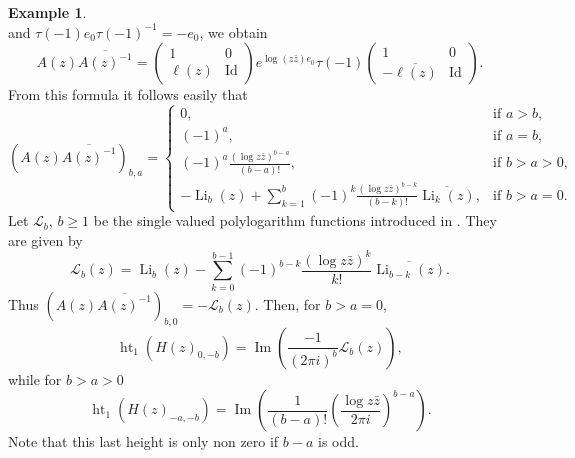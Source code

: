 \documentclass[11pt,a4paper]{amsart}
\newcommand{\caL}{\mathcal{L}}
\DeclareMathOperator{\im}{Im}
\DeclareMathOperator{\Id}{Id}
\DeclareMathOperator{\Ht}{ht}
\DeclareMathOperator{\Li}{Li}
\numberwithin{equation}{section}
\theoremstyle{plain}
\theoremstyle{definition}
\newtheorem{ex}[prop]{Example}
\begin{document}
\begin{ex}
\begin{displaymath}
  \end{displaymath}
  and $\tau (-1)e_{0}\tau (-1)^{-1}=-e_{0}$, we obtain
  \begin{displaymath}
    A(z)\overline{A(z)^{-1}}=
    \begin{pmatrix}
      1 & 0\\
      \ell(z) & \Id
    \end{pmatrix}e^{\log (z\bar z) e_{0}}
      \tau (-1)
      \begin{pmatrix}
      1 & 0\\
      -\overline{\ell(z)} & \Id
    \end{pmatrix}.
  \end{displaymath}
  From this formula it follows easily that
  \begin{displaymath}
    (A(z)\overline{A(z)^{-1}})_{b,a}=
    \begin{cases}
      0,&\text{if  }a>b,\\
      (-1)^{a},& \text{if }a=b,\\
      (-1)^{a}\frac{(\log z\bar
      z)^{b-a}}{(b-a)!},&  \text{if }b>a>0,\\
      \displaystyle
      -\Li_{b}(z)+\sum_{k=1}^{b}(-1)^{k}\frac{(\log z\bar
      z)^{b-k}}{(b-k)!}\overline {\Li_{k}(z)},&  \text{if }b>a=0.
    \end{cases}
  \end{displaymath}
  Let $\caL_{b}$, $b\ge 1$ be the single valued polylogarithm
  functions introduced in \cite{brown04:_singl}. They are given by
  \begin{displaymath}
    \caL_{b}(z)= \Li_{b}(z)-\sum_{k=0}^{b-1}(-1)^{b-k}\frac{(\log z\bar
      z)^{k}}{k!}\overline {\Li_{b-k}(z)}.
  \end{displaymath}
Thus $(A(z)\overline{A(z)^{-1}})_{b,0}=-\caL_{b}(z)$.
Then, for $b>a=0$,
  \begin{equation}
    \label{eq:27}
    \Ht_{1}(H(z)_{0,-b})=\im\left( \frac{-1}{(2\pi i)^{b}}\caL_{b}(z)\right),
  \end{equation}
  while for $b> a>0$
  \begin{equation}
    \label{eq:28}
    \Ht_{1}(H(z)_{-a,-b})=\im\left( \frac {1}{(b-a)!}\left( \frac{\log
        z\bar z}{2\pi i}\right)^{b-a}\right).
  \end{equation}
  Note that this last height is only non zero if $b-a$ is odd.
\end{ex}
\end{document}
